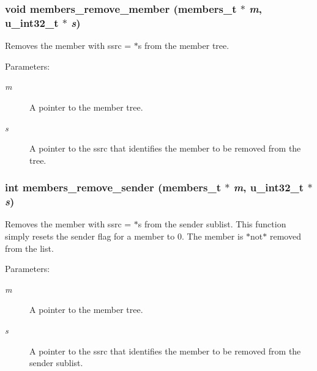 \subsubsection{\setlength{\rightskip}{0pt plus 5cm}void members\_\-remove\_\-member ({\bf members\_\-t} $\ast$ {\em m}, u\_\-int32\_\-t $\ast$ {\em s})}\label{members_8h_a3}


Removes the member with ssrc = $\ast$s from the member tree. \begin{Desc}
\item[Parameters:]
\begin{description}
\item[{\em m}]A pointer to the member tree. \item[{\em s}]A pointer to the ssrc that identifies the member to be removed from the tree. \end{description}
\end{Desc}
\subsubsection{\setlength{\rightskip}{0pt plus 5cm}int members\_\-remove\_\-sender ({\bf members\_\-t} $\ast$ {\em m}, u\_\-int32\_\-t $\ast$ {\em s})}\label{members_8h_a5}


Removes the member with ssrc = $\ast$s from the sender sublist. This function simply resets the sender flag for a member to 0. The member is $\ast$not$\ast$ removed from the list. \begin{Desc}
\item[Parameters:]
\begin{description}
\item[{\em m}]A pointer to the member tree. \item[{\em s}]A pointer to the ssrc that identifies the member to be removed from the sender sublist. \end{description}
\end{Desc}
